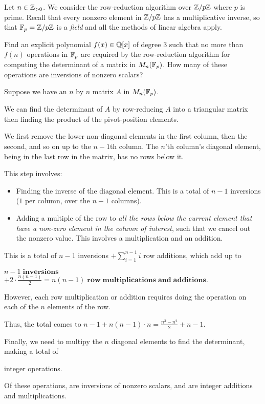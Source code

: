 \begin{problem}
Let $n \in \mathbb{Z}_{>0}$.  We consider the row-reduction algorithm over
$\mathbb{Z}/p\mathbb{Z}$ where $p$ is prime.  Recall that every nonzero element in
$\mathbb{Z}/p\mathbb{Z}$ has a multiplicative inverse, so that $\mathbb{F}_p=\mathbb{Z}/p\mathbb{Z}$ is a
\emph{field} and all the methods of linear algebra apply.

Find an explicit polynomial $f(x) \in \mathbb{Q}[x]$ of degree $3$ such that
no more than $f(n)$ operations in $\mathbb{F}_p$ are required by the
row-reduction algorithm for computing the determinant of a matrix in
$M_n(\mathbb{F}_p)$.  How many of these operations are inversions of nonzero scalars?
\end{problem}

\begin{Answer}
Suppose we have an $n$ by $n$ matrix $A$ in $M_n(\mathbb{F}_p)$.

\noindent
We can find the determinant of $A$ by row-reducing $A$ into a triangular matrix 
then finding the product of the pivot-position elements.

\noindent
We first remove the lower non-diagonal elements in the first column,
then the second, and so on up to the $n-1$th column.
The $n$'th column's diagonal element, being in the last row in the matrix,
has no rows below it.

\noindent
This step involves:
\begin{itemize}
  \item Finding the inverse of the diagonal element. This is a total of $n-1$ inversions
    ($1$ per column, over the $n-1$ columns).
  \item Adding a multiple of the row to \textit{all the rows below the current element
    that have a non-zero element in the column of interest},
    such that we cancel out the nonzero value. This involves a multiplication and an addition.
\end{itemize}

\noindent
This is a total of $n - 1$ inversions $+ \sum_{i=1}^{n-1} i$ row additions,
which add up to 

$n - 1 \mathbf{\;inversions}$ 
$+2 \cdot \frac{n(n-1)}{2} = n(n-1) \mathbf{\;row \;multiplications\; and\; additions}$.

\noindent
However, each row multiplication or addition requires doing the operation
on each of the $n$ elements of the row.

\noindent
Thus, the total comes to $n - 1 +
n (n-1)\cdot n = \frac{n^3 - n^2}{2} + n - 1$.

\noindent
Finally, we need to multipy the $n$ diagonal elements to find the determinant,
making a total of 

 integer operations.

\noindent
Of these operations,  are inversions of nonzero scalars, 
and  are integer additions and multiplications.

\end{Answer}
